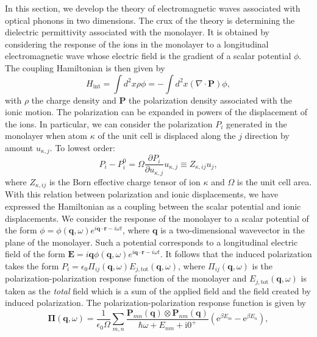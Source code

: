 \documentclass[aps,prb,twocolumn,
	groupedaddress,superscriptaddress,
	amsfonts,amssymb,amsmath,floatfix,
	citeautoscript]{revtex4-1}
\newcommand{\iu}{\mathrm{i}}
\newcommand{\e}{\mathrm{e}}
\begin{document}
In this section, we develop the theory of electromagnetic waves associated with optical phonons in two dimensions. The crux of the theory is determining the dielectric permittivity associated with the monolayer. It is obtained by considering the response of the ions in the monolayer to a longitudinal electromagnetic wave whose electric field is the gradient of a scalar potential $\phi$. The coupling Hamiltonian is then given by
\begin{equation}
H_{\mathrm{int}} = \int d^2x \rho \phi = -\int d^2x (\nabla\cdot\mathbf{P})\phi,
\end{equation} 
with $\rho$ the charge density and $\mathbf{P}$ the polarization density associated with the ionic motion. The polarization can be expanded in powers of the displacement of the ions. In particular, we can consider the polarization $P_i$ generated in the monolayer when atom $\kappa$ of the unit cell is displaced along the $j$ direction by amount $u_{\kappa,j}$. To lowest order:
\begin{equation}
P_i - P_i^{0} = \Omega\frac{\partial P_i}{\partial u_{\kappa,j}}u_{\kappa,j} \equiv Z_{\kappa,ij}u_{j},
\end{equation} 
where $Z_{\kappa,ij}$ is the Born effective charge tensor of ion $\kappa$ and $\Omega$ is the unit cell area. With this relation between polarization and ionic displacements, we have expressed the Hamiltonian as a coupling between the scalar potential and ionic displacements. We consider the response of the monolayer to a scalar potential of the form $\phi = \phi(\mathbf{q},\omega)e^{i\mathbf{q}\cdot\mathbf{r}-i\omega t}$, where $\mathbf{q}$ is a two-dimensional wavevector in the plane of the monolayer. Such a potential corresponds to a longitudinal electric field of the form $\mathbf{E} = i\mathbf{q}\phi(\mathbf{q},\omega)e^{i\mathbf{q}\cdot\mathbf{r}-i\omega t}$. It follows that the induced polarization takes the form $P_i  = \epsilon_0\Pi_{ij}(\mathbf{q},\omega)E_{j,\mathrm{tot}}(\mathbf{q},\omega)$, where $\Pi_{ij}(\mathbf{q},\omega)$ is the polarization-polarization response function of the monolayer and  $E_{j,\mathrm{tot}}(\mathbf{q},\omega)$ is taken as the \textit{total} field which is a sum of the applied field and the field created by induced polarization. The polarization-polarization response function is given by
\begin{equation}\label{eq:2dsusceptibility}
\boldsymbol{\Pi}(\mathbf{q},\omega) =  \frac{1}{\epsilon_0 \Omega}\sum\limits_{m,n}\frac{\mathbf{P}_{mn}(\mathbf{q})\otimes\mathbf{P}_{nm}(\mathbf{q})}{\hbar\omega + E_{nm}+\iu 0^+}\left(\e^{\beta E_m}-\e^{\beta E_n} \right),
\end{equation}
\end{document}
